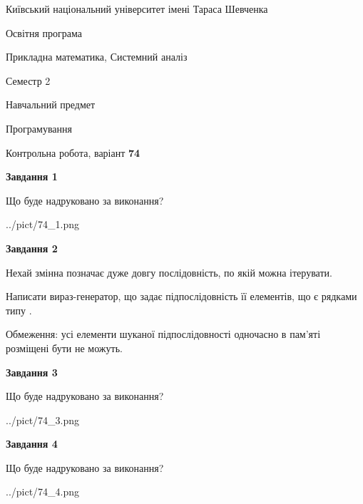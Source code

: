 \documentclass[12pt, ukrainian]{article}
\begin{document}
{{\begin {small}\par
{ \center  Київський національний університет імені Тараса Шевченка \par}
{\parbox {5 cm}{Освітня програма \hfill}{\parbox {8 cm}{Прикладна математика, Системний аналіз \hfill}}\parbox {5 cm}{\hfill Семестр 2}}\par
{\parbox {5 cm} {Навчальний предмет \hfill}\parbox {7 cm}{Програмування \hfill}\parbox {6cm}{\hfill}\par}\vspace{-7pt} \end{small}}{\center Контрольна робота, варіант  \No \textbf
{ 74 }\par}}
{
\begin {large}
{\begin {center}\textbf{Завдання 1}\end {center}}\par
Що буде надруковано за виконання?\par\par
\begin{center}
	{../pict/74_1.png}
\end{center}
\newpage

{\begin {center}\textbf{Завдання 2}\end {center}}\par
Нехай змінна  позначає дуже довгу послідовність, по якій можна ітерувати.

Написати вираз-генератор, що задає підпослідовність її елементів, що є рядками типу .

Обмеження: усі елементи шуканої підпослідовності одночасно в пам'яті розміщені бути не можуть.\par
\newpage

{\begin {center}\textbf{Завдання 3}\end {center}}\par
Що буде надруковано за виконання?\par
\begin{center}
	{../pict/74_3.png}
\end{center}
\newpage

{\begin {center}\textbf{Завдання 4}\end {center}}\par
Що буде надруковано за виконання?\par
\begin{center}
	{../pict/74_4.png}
\end{center}
\newpage


\end{large}}
\end{document}
